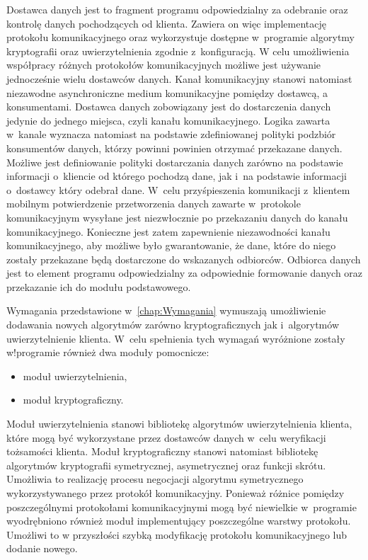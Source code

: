Dostawca danych jest to fragment programu odpowiedzialny za odebranie
oraz kontrolę danych pochodzących od klienta. Zawiera on więc
implementację protokołu komunikacyjnego oraz wykorzystuje dostępne
w~programie algorytmy kryptografii oraz uwierzytelnienia zgodnie
z~konfiguracją. W celu umożliwienia współpracy różnych protokołów
komunikacyjnych możliwe jest używanie jednocześnie wielu dostawców
danych. Kanał komunikacyjny stanowi natomiast niezawodne
asynchroniczne medium komunikacyjne pomiędzy dostawcą, a
konsumentami. Dostawca danych zobowiązany jest do dostarczenia danych
jedynie do jednego miejsca, czyli kanału komunikacyjnego. Logika
zawarta w~kanale wyznacza natomiast na podstawie zdefiniowanej
polityki podzbiór konsumentów danych, którzy powinni powinien otrzymać
przekazane danych. Możliwe jest definiowanie polityki dostarczania
danych zarówno na podstawie informacji o~kliencie od którego pochodzą
dane, jak i~na podstawie informacji o~dostawcy który odebrał
dane. W~celu przyśpieszenia komunikacji z~klientem mobilnym
potwierdzenie przetworzenia danych zawarte w~protokole komunikacyjnym
wysyłane jest niezwłocznie po przekazaniu danych do kanału
komunikacyjnego. Konieczne jest zatem zapewnienie niezawodności kanału
komunikacyjnego, aby możliwe było gwarantowanie, że dane, które do
niego zostały przekazane będą dostarczone do wskazanych
odbiorców. Odbiorca danych jest to element programu odpowiedzialny za
odpowiednie formowanie danych oraz przekazanie ich do modułu
podstawowego.


Wymagania przedstawione w~\ref{chap:Wymagania} wymuszają umożliwienie
dodawania nowych algorytmów zarówno kryptograficznych jak i~algorytmów
uwierzytelnienie klienta. W~celu spełnienia tych wymagań wyróżnione
zostały w!programie również dwa moduły pomocnicze:

\begin{itemize}
\item moduł uwierzytelnienia,
\item moduł kryptograficzny.
\end{itemize}

Moduł uwierzytelnienia stanowi bibliotekę algorytmów uwierzytelnienia
klienta, które mogą być wykorzystane przez dostawców danych w~celu
weryfikacji tożsamości klienta. Moduł kryptograficzny stanowi
natomiast bibliotekę algorytmów kryptografii symetrycznej,
asymetrycznej oraz funkcji skrótu. Umożliwia to realizację procesu
negocjacji algorytmu symetrycznego wykorzystywanego przez protokół
komunikacyjny. Ponieważ różnice pomiędzy poszczególnymi protokołami
komunikacyjnymi mogą być niewielkie w~programie wyodrębniono również
moduł implementujący poszczególne warstwy protokołu. Umożliwi to w
przyszłości szybką modyfikację protokołu komunikacyjnego lub dodanie
nowego.

